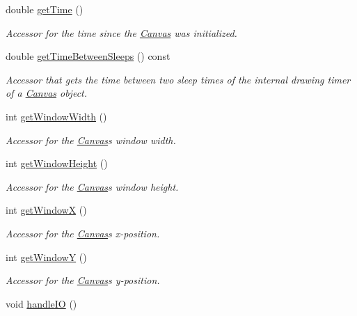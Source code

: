 \begin{DoxyCompactItemize}
double \hyperlink{classtsgl_1_1_canvas_aef462ab48e59571b9c88076bbdc8f0b3}{get\+Time} ()
\begin{DoxyCompactList}\small\item\em Accessor for the time since the \hyperlink{classtsgl_1_1_canvas}{Canvas} was initialized. \end{DoxyCompactList}\item 
double \hyperlink{classtsgl_1_1_canvas_a8786d28042b767f5c075361100227af4}{get\+Time\+Between\+Sleeps} () const 
\begin{DoxyCompactList}\small\item\em Accessor that gets the time between two sleep times of the internal drawing timer of a \hyperlink{classtsgl_1_1_canvas}{Canvas} object. \end{DoxyCompactList}\item 
int \hyperlink{classtsgl_1_1_canvas_a086a0322f4a6ab27da6929b1aa0593af}{get\+Window\+Width} ()
\begin{DoxyCompactList}\small\item\em Accessor for the \hyperlink{classtsgl_1_1_canvas}{Canvas}\textquotesingle{}s window width. \end{DoxyCompactList}\item 
int \hyperlink{classtsgl_1_1_canvas_ad740ebe5d6bd69ab79cde3e84f369f35}{get\+Window\+Height} ()
\begin{DoxyCompactList}\small\item\em Accessor for the \hyperlink{classtsgl_1_1_canvas}{Canvas}\textquotesingle{}s window height. \end{DoxyCompactList}\item 
int \hyperlink{classtsgl_1_1_canvas_a011ce2354d4565f9d2a323411a47d52d}{get\+Window\+X} ()
\begin{DoxyCompactList}\small\item\em Accessor for the \hyperlink{classtsgl_1_1_canvas}{Canvas}\textquotesingle{}s x-\/position. \end{DoxyCompactList}\item 
int \hyperlink{classtsgl_1_1_canvas_ad6e98d17d3e43d79628a3bd05221ee8b}{get\+Window\+Y} ()
\begin{DoxyCompactList}\small\item\em Accessor for the \hyperlink{classtsgl_1_1_canvas}{Canvas}\textquotesingle{}s y-\/position. \end{DoxyCompactList}\item 
void \hyperlink{classtsgl_1_1_canvas_aa499851e5e4b97bb99ca4fb3d633c17e}{handle\+I\+O} ()

\end{DoxyCompactItemize}
